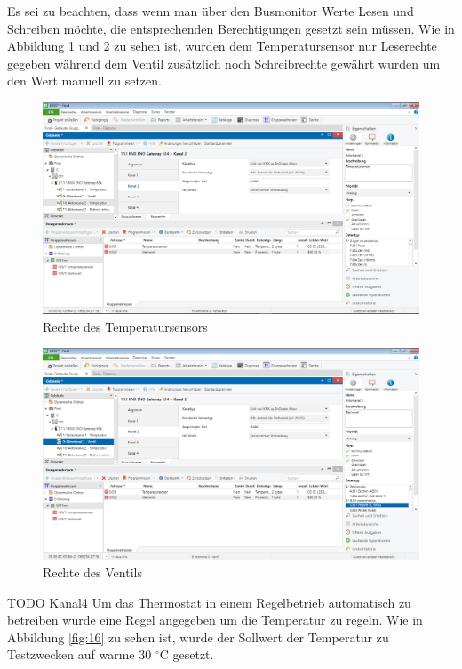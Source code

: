 \documentclass[a4paper]{article}
\begin{document}
Es sei zu beachten, dass wenn man über den Busmonitor Werte Lesen und Schreiben möchte, die entsprechenden Berechtigungen gesetzt sein müssen. Wie in Abbildung \ref{fig:14} und \ref{fig:15} zu sehen ist, wurden dem Temperatursensor nur Leserechte gegeben während dem Ventil zusätzlich noch Schreibrechte gewährt wurden um den Wert manuell zu setzen.

\begin{figure}[h!]
	\centering
	\includegraphics[width=13cm]{Doku/14}
	\caption{Rechte des Temperatursensors}
	\label{fig:14}
\end{figure}

\begin{figure}[h!]
	\centering
	\includegraphics[width=13cm]{Doku/15}
	\caption{Rechte des Ventils}
	\label{fig:15}
\end{figure}

TODO Kanal4
Um das Thermostat in einem Regelbetrieb automatisch zu betreiben wurde eine Regel angegeben um die Temperatur zu regeln. Wie in Abbildung \ref{fig:16} zu sehen ist, wurde der Sollwert der Temperatur zu Testzwecken auf warme 30 $^{\circ}$C gesetzt.
\end{document}
